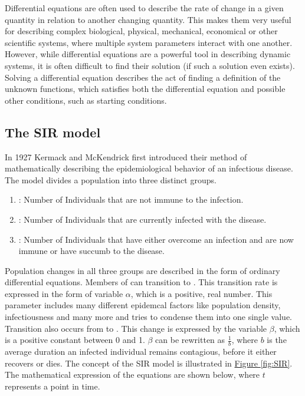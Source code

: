 Differential equations are often used to describe the rate of change in a given quantity in relation to another
changing quantity. This makes them very useful for describing complex biological, physical, mechanical, economical
or other scientific systems, where multiple system parameters interact with one another. However, while differential
equations are a powerful tool in describing dynamic systems, it is often difficult to find their solution (if such
a solution even exists). Solving a differential equation describes the act of finding a definition of the
unknown functions, which satisfies both the differential equation and possible other conditions, such as starting
conditions.


\subsection{The SIR model}
\label{sec:SIR}
In 1927 Kermack and McKendrick\cite{kermack1991contributions} first introduced their method of mathematically describing  
the epidemiological behavior of an infectious disease. The model divides a population into three distinct groups.

\begin{enumerate}[label=$\bullet$]
	\item {}: Number of Individuals that are not immune to the infection.
	\item {}: Number of Individuals that are currently infected with the disease.
	\item {}: Number of Individuals that  have either overcome an infection and are now immune or have succumb to the disease.
\end{enumerate}


Population changes in all three groups are described in the form of ordinary differential equations\cite{mathSIR}.
Members of  can transition to . This transition rate is expressed in the
form of variable $\alpha$, which is a positive, real number. This parameter includes many different epidemcal factors like
population density, infectiousness and many more and tries to condense them into one single value.
Transition also occurs from  to . This change is expressed by the variable 
$\beta$, which is a positive constant between 0 and 1. $\beta$ can be rewritten as $\frac{1}{b}$, where $b$ is the average
duration an infected individual remains contagious, before it either recovers or dies. The concept of the SIR model is
illustrated in \hyperref[fig:SIR]{Figure \ref*{fig:SIR}}. The mathematical expression of the equations are shown below, where
$t$ represents a point in time.

